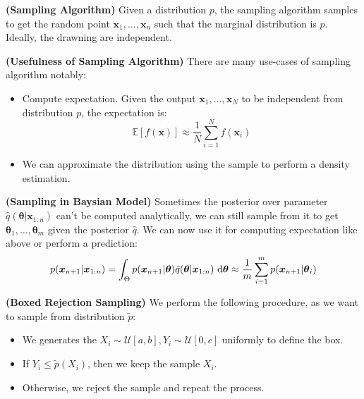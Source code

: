 \begin{definition}{\textbf{(Sampling Algorithm)}}
    Given a distribution $p$, the sampling algorithm samples to get the random point $\boldsymbol x_1,\dots,\boldsymbol x_n$ such that the marginal distribution is $p$. Ideally, the drawning are independent.
\end{definition}

\begin{remark}{\textbf{(Usefulness of Sampling Algorithm)}}
    There are many use-cases of sampling algorithm notably:
    \begin{itemize}
        \item Compute expectation. Given the output $\boldsymbol x_1,\dots,\boldsymbol x_N$ to be independent from distribution $p$, the expectation is:
        \begin{equation*}
            \mathbb{E}[f(\boldsymbol x)] \approx \frac{1}{N}\sum^N_{i=1}f(\boldsymbol x_i)
        \end{equation*}
        \item We can approximate the distribution using the sample to perform a density estimation.
    \end{itemize}
\end{remark}

\begin{definition}{\textbf{(Sampling in Baysian Model)}}
    Sometimes the posterior over parameter $\hat{q}(\boldsymbol \theta | \boldsymbol x_{1:n})$ can't be computed analytically, we can still sample from it to get $\boldsymbol \theta_1,\dots, \boldsymbol \theta_m$ given the posterior $\hat{q}$. We can now use it for computing expectation like above or perform a prediction:
    \begin{equation*}
        p(\boldsymbol x_{n+1} | \boldsymbol x_{1:n}) = \int_{\Theta} p(\boldsymbol x_{n+1} | \boldsymbol \theta) \hat{q}(\boldsymbol \theta | \boldsymbol x_{1:n})\ \mathrm{d} \boldsymbol \theta \approx \frac{1}{m}\sum^m_{i=1}p(\boldsymbol x_{n+1}|\boldsymbol \theta_i)
    \end{equation*}
\end{definition}

\begin{definition}{\textbf{(Boxed Rejection Sampling)}}
    We perform the following procedure, as we want to sample from distribution $\tilde{p}$:
    \begin{itemize}
        \item We generates the $X_i \sim \mathcal{U}[a, b], Y_i\sim\mathcal{U}[0, c]$ uniformly to define the box. 
        \item If $Y_i \le \tilde{p}(X_i)$, then we keep the sample $X_i$.
        \item Otherwise, we reject the sample and repeat the process. 
    \end{itemize}
\end{definition}


